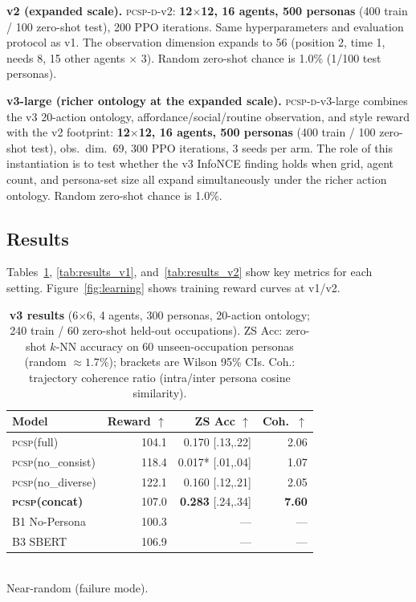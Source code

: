 \documentclass[conference]{IEEEtran}
\newcommand{\PCSP}{\textsc{pcsp}\xspace}
\newcommand{\PCSPD}{\textsc{pcsp-d}\xspace}
\begin{document}
\textbf{v2 (expanded scale).}
\PCSPD-v2: \textbf{12$\times$12, 16 agents, 500 personas} (400 train / 100
zero-shot test), 200 PPO iterations.
Same hyperparameters and evaluation protocol as v1.
The observation dimension expands to 56 (position 2, time 1, needs 8,
15 other agents $\times$ 3).
Random zero-shot chance is 1.0\% (1/100 test personas).

\textbf{v3-large (richer ontology at the expanded scale).}
\PCSPD-v3-large combines the v3 20-action ontology, affordance/social/routine
observation, and style reward with the v2 footprint:
\textbf{12$\times$12, 16 agents, 500 personas} (400 train / 100 zero-shot
test), obs.\ dim.\ 69, 300 PPO iterations, 3 seeds per arm.
The role of this instantiation is to test whether the v3 InfoNCE finding
holds when grid, agent count, and persona-set size all expand simultaneously
under the richer action ontology. Random zero-shot chance is 1.0\%.

\subsection{Results}

Tables~\ref{tab:results_v3}, \ref{tab:results_v1}, and~\ref{tab:results_v2}
show key metrics for each setting. Figure~\ref{fig:learning} shows training
reward curves at v1/v2.

\begin{table}[t]
  \centering
  \small
  \caption{%
    \textbf{v3 results} (6$\times$6, 4 agents, 300 personas, 20-action
    ontology; 240 train / 60 zero-shot held-out occupations).
    ZS Acc: zero-shot $k$-NN accuracy on 60 unseen-occupation personas
    (random $\approx\!1.7\%$); brackets are Wilson 95\% CIs.
    Coh.: trajectory coherence ratio (intra/inter persona cosine similarity).}
  \label{tab:results_v3}
  \setlength{\tabcolsep}{3pt}
  \begin{tabular}{lrrr}
    \toprule
    Model & Reward $\uparrow$ & ZS Acc $\uparrow$ & Coh.\ $\uparrow$ \\
    \midrule
    \PCSP (full)                 & 104.1 & 0.170 \scriptsize{[.13,.22]}              & 2.06 \\
    \PCSP (no\_consist)          & 118.4 & 0.017* \scriptsize{[.01,.04]}             & 1.07 \\
    \PCSP (no\_diverse)          & 122.1 & 0.160 \scriptsize{[.12,.21]}              & 2.05 \\
    \textbf{\PCSP (concat)}      & 107.0 & \textbf{0.283} \scriptsize{[.24,.34]}     & \textbf{7.60} \\
    B1 No-Persona                & 100.3 & ---                                        & --- \\
    B3 SBERT                     & 106.9 & ---                                        & --- \\
    \bottomrule
  \end{tabular}\\[2pt]
  {\footnotesize * Near-random (failure mode).}
\end{table}
\end{document}
